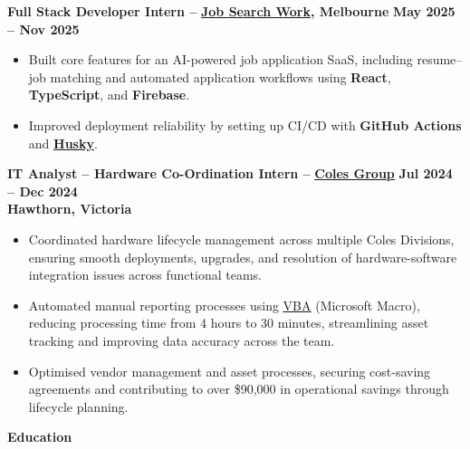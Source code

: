 \documentclass[11pt, a4paper]{article}
\let\hrefnoul\href
\renewcommand{\href}[2]{\hrefnoul{#1}{\ul{#2}}}
\newcommand{\resumesection}[1]{%
  \vspace{8pt}\par
  {\setlength{\fboxsep}{5pt}%
   \noindent\colorbox{sectionbg}{%
     \parbox{\dimexpr\linewidth-10pt\relax}{\strut\textbf{\large #1}\strut}%
   }}%
  \vspace{2pt}\par
}
\begin{document}
\vspace{4pt}
\noindent\textbf{Full Stack Developer Intern –}
\href{https://app.jobsearch.works/}{\textbf{Job Search Work}}\textbf{, Melbourne}%
\hfill\textbf{May 2025 – Nov 2025}

\begin{itemize}[leftmargin=1.5em, itemsep=3pt, topsep=2pt, parsep=0pt]
  \item Built core features for an AI-powered job application SaaS, including resume--job matching
        and automated application workflows using \textbf{React}, \textbf{TypeScript}, and
        \textbf{Firebase}.

  \item Improved deployment reliability by setting up CI/CD with \textbf{GitHub Actions} and
        \href{https://typicode.github.io/husky/}{\textbf{Husky}}.
\end{itemize}

\vspace{4pt}
\noindent\textbf{IT Analyst – Hardware Co-Ordination Intern –}
\href{https://www.linkedin.com/company/colesgroup/posts/?feedView=all}{\textbf{Coles Group}}%
\hfill\textbf{Jul 2024 – Dec 2024}\\
\textbf{Hawthorn, Victoria}

\begin{itemize}[leftmargin=1.5em, itemsep=3pt, topsep=2pt, parsep=0pt]
  \item Coordinated hardware lifecycle management across multiple Coles Divisions, ensuring smooth
        deployments, upgrades, and resolution of hardware-software integration issues across
        functional teams.

  \item Automated manual reporting processes using
        \href{https://learn.microsoft.com/en-us/office/vba/library-reference/concepts/getting-started-with-vba-in-office}{VBA}
        (Microsoft Macro), reducing processing time from 4 hours to 30 minutes, streamlining
        asset tracking and improving data accuracy across the team.

  \item Optimised vendor management and asset processes, securing cost-saving agreements and
        contributing to over \$90,000 in operational savings through lifecycle planning.
\end{itemize}

\resumesection{Education}
\end{document}

